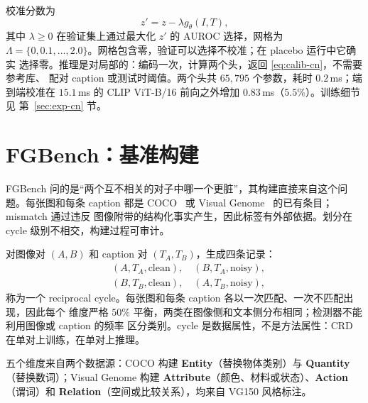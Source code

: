 \documentclass[10pt,twocolumn,a4paper]{ctexart}
\begin{document}
校准分数为
\begin{equation}
  z'=z-\lambda g_\theta(I,T),
  \label{eq:calib-cn}
\end{equation}
其中 $\lambda\ge0$ 在验证集上通过最大化 $z'$ 的 AUROC 选择，网格为
$\Lambda=\{0,0.1,\dots,2.0\}$。网格包含零，验证可以选择不校准；在 placebo 运行中它确实
选择零。推理是对局部的：编码一次，计算两个头，返回 \eqref{eq:calib-cn}，不需要参考库、
配对 caption 或测试时阈值。两个头共 $65{,}795$ 个参数，耗时 $0.2$\,ms；端到端校准在
$15.1$\,ms 的 CLIP ViT-B/16 前向之外增加 $0.83$\,ms（$5.5\%$）。训练细节见
第~\ref{sec:exp-cn} 节。

\section{FGBench：基准构建}
\label{sec:fgbench-cn}

FGBench 问的是“两个互不相关的对子中哪一个更脏”，其构建直接来自这个问题。每张图和每条
caption 都是 COCO~\cite{coco} 或 Visual Genome~\cite{vg} 的已有条目；mismatch 通过违反
图像附带的结构化事实产生，因此标签有外部依据。划分在 cycle 级别不相交，构建过程可审计。

对图像对 $(A,B)$ 和 caption 对 $(T_A,T_B)$，生成四条记录：
\begin{equation}
\begin{aligned}
  &(A,T_A,\text{clean}),\quad (B,T_A,\text{noisy}),\\
  &(B,T_B,\text{clean}),\quad (A,T_B,\text{noisy}),
\end{aligned}
\end{equation}
称为一个 reciprocal cycle。每张图和每条 caption 各以一次匹配、一次不匹配出现，因此每个
维度严格 $50\%$ 平衡，两类在图像侧和文本侧分布相同；检测器不能利用图像或 caption 的频率
区分类别。cycle 是数据属性，不是方法属性：CRD 在单对上训练，在单对上推理。

五个维度来自两个数据源：COCO 构建 \textbf{Entity}（替换物体类别）与 \textbf{Quantity}
（替换数词）；Visual Genome 构建 \textbf{Attribute}（颜色、材料或状态）、\textbf{Action}
（谓词）和 \textbf{Relation}（空间或比较关系），均来自 VG150 风格标注。
\end{document}
